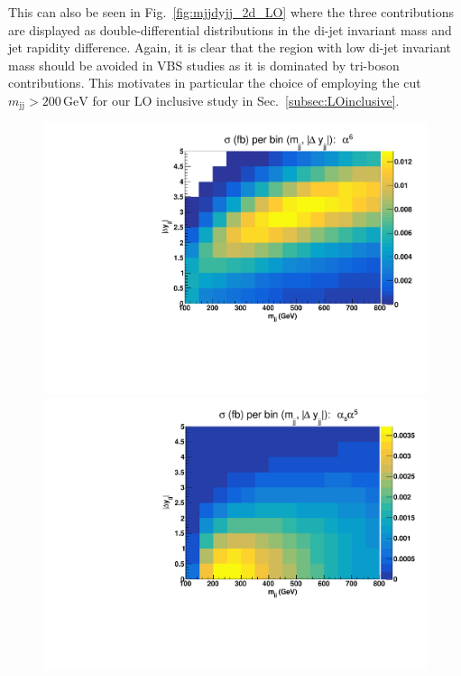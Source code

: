 \documentclass[twocolumn,epjc3]{svjour3} %
\newcommand{\Pj}{\ensuremath{\text{j}}\xspace}
\newcommand{\GeV}{\ensuremath{\,\text{GeV}}\xspace}
\begin{document}
    This can also be seen in Fig.~\ref{fig:mjjdyjj_2d_LO} where the three contributions are displayed as double-differential distributions in the di-jet invariant mass and jet rapidity difference.
    Again, it is clear that the region with low di-jet invariant mass should be avoided in VBS studies as it is dominated by tri-boson contributions.
    This motivates in particular the choice of employing the cut $m_{\Pj\Pj} > 200\GeV$ for our LO inclusive study in Sec.~\ref{subsec:LOinclusive}.

    \begin{figure}[hbt]
    \centering
    \includegraphics[scale=0.395]{figures/scanfigures/scan_ew6.pdf}
    \includegraphics[scale=0.395]{figures/scanfigures/scan_ew5qcd1.pdf}

\end{figure}
\end{document}
